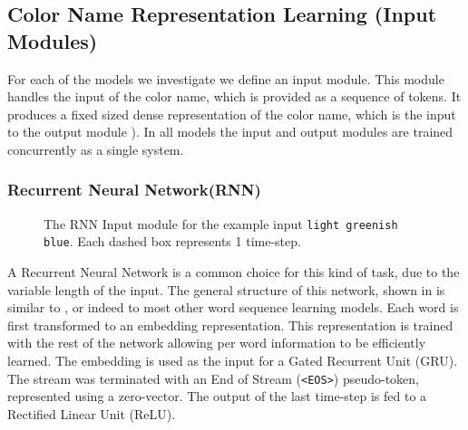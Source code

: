 \documentclass[]{book}
\newcommand{\textcite}{\citet}
\newcommand{\natlang}[1]{\texttt{#1}}
\begin{document}
\subsection{Color Name Representation Learning (Input Modules)}\label{sec:inputmod}
For each of the models we investigate we define an input module.
This module handles the input of the color name, which is provided as a sequence of tokens.
It produces a fixed sized dense representation of the color name,
which is the input to the output module ).
In all models the input and output modules are trained concurrently as a single system.

\subsubsection{Recurrent Neural Network(RNN)}\label{sec:rnnmod}
\begin{figure}
	
	\caption{The RNN Input module for the example input \natlang{light greenish blue}. Each dashed box represents 1 time-step. \label{fig:rnnmod}}
\end{figure}


A Recurrent Neural Network is a common choice for this kind of task,
due to the variable length of the input.
The general structure of this network, shown in  is similar to \textcite{2016arXiv160603821M}, or indeed to most other word sequence learning models.
Each word is first transformed to an embedding representation.
This representation is trained with the rest of the network allowing per word information to be efficiently learned.
The embedding is used as the input for a Gated Recurrent Unit (GRU).
The stream was terminated with an End of Stream (\natlang{<EOS>}) pseudo-token,
represented using a zero-vector.
The output of the last time-step is fed to a Rectified Linear Unit (ReLU).
\end{document}
